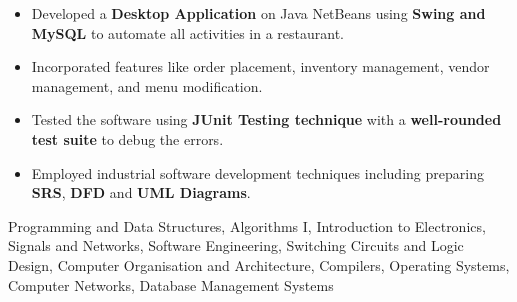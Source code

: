\documentclass[10pt]{article}
\begin{document}
\begin{itemize}
    \item Developed a \textbf{Desktop Application} on Java NetBeans using \textbf{Swing and MySQL} to automate all activities in a restaurant.\\[-2em]
    \item Incorporated features like order placement, inventory management, vendor management, and menu modification.\\[-2em]
    \item Tested the software using \textbf{JUnit Testing technique} with a \textbf{well-rounded test suite} to debug the errors. \\[-2em]
    \item Employed industrial software development techniques including preparing \textbf{SRS}, \textbf{DFD} and \textbf{UML Diagrams}. \\[-2em]
\end{itemize}

\spacedhrule{0.1ex}{1.0ex}
\begin{indentsection}
	{Programming and Data Structures, Algorithms I, Introduction to Electronics, Signals and Networks, Software Engineering, Switching Circuits and Logic Design, Computer Organisation and Architecture, Compilers, Operating Systems, Computer Networks, Database Management Systems }
\end{indentsection}

\spacedhrule{0.1ex}{1.0ex}
\begin{indentsection}
\end{indentsection}
\end{document}
